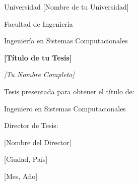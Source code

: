 \begin{titlepage}
    \centering
    \vspace*{2cm}
    
    {\Large Universidad [Nombre de tu Universidad]\par}
    \vspace{1.5cm}
    
    {\Large Facultad de Ingeniería\par}
    {\Large Ingeniería en Sistemas Computacionales\par}
    \vspace{2cm}
    
    {\huge\bfseries [Título de tu Tesis]\par}
    \vspace{2cm}
    
    {\Large\itshape [Tu Nombre Completo]\par}
    \vfill
    
    {\large Tesis presentada para obtener el título de:\par}
    {\Large Ingeniero en Sistemas Computacionales\par}
    \vspace{1cm}
    
    {\large Director de Tesis:\par}
    {\Large [Nombre del Director]\par}
    \vspace{1cm}
    
    {\large [Ciudad, País]\par}
    {\large [Mes, Año]\par}
    
\end{titlepage}